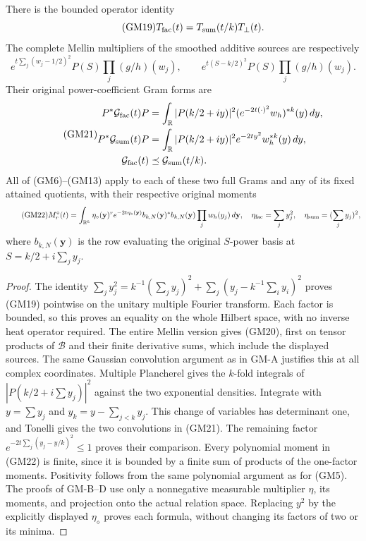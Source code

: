 \begin{theorem}
There is the bounded operator identity
\begin{equation}\tag{GM19}
 T_{\rm fac}(t)=T_{\rm sum}(t/k)T_{\perp}(t).
\end{equation}
The complete Mellin multipliers of the smoothed additive sources are
respectively
\begin{equation}\tag{GM20}
 e^{t\sum_j(w_j-1/2)^2}P(S)\prod_j(g/h)(w_j),\qquad
 e^{t(S-k/2)^2}P(S)\prod_j(g/h)(w_j).
\end{equation}
Their original power-coefficient Gram forms are
\begin{equation}\tag{GM21}
 \begin{split}
 P^*\mathcal G_{\rm fac}(t)P
 &=\int_{\mathbb R}|P(k/2+iy)|^2
               (e^{-2t(\cdot)^2}w_h)^{*k}(y)\,dy,\\
 P^*\mathcal G_{\rm sum}(t)P
 &=\int_{\mathbb R}|P(k/2+iy)|^2
                 e^{-2ty^2}w_h^{*k}(y)\,dy,\\
 \mathcal G_{\rm fac}(t)&\preceq\mathcal G_{\rm sum}(t/k).
 \end{split}
\end{equation}
All of (GM6)--(GM13) apply to each of these two full Grams and any
of its fixed attained quotients, with their respective original
moments
\begin{equation}\tag{GM22}
 M_r^\diamond(t)=\int_{\mathbb R^k}
   \eta_\diamond(\mathbf y)^r e^{-2t\eta_\diamond(\mathbf y)}
   b_{k,N}(\mathbf y)^*b_{k,N}(\mathbf y)
                          \prod_jw_h(y_j)\,d\mathbf y,
 \quad
 \eta_{\rm fac}=\sum_jy_j^2,\quad
 \eta_{\rm sum}=(\sum_jy_j)^2,
\end{equation}
where $b_{k,N}(\mathbf y)$ is the row evaluating the original
$S$-power basis at $S=k/2+i\sum_jy_j$.
\end{theorem}
\begin{proof}
The identity
$\sum_jy_j^2=k^{-1}(\sum_jy_j)^2+
\sum_j(y_j-k^{-1}\sum_i y_i)^2$ proves (GM19) pointwise on the
unitary multiple Fourier transform.  Each factor is bounded, so this
proves an equality on the whole Hilbert space, with no inverse heat
operator required.  The entire Mellin version gives (GM20), first on
tensor products of $\mathscr B$ and their finite derivative sums,
which include the displayed sources.  The same Gaussian convolution
argument as in GM-A justifies this at all complex coordinates.
Multiple Plancherel gives the $k$-fold integrals of
$|P(k/2+i\sum y_j)|^2$ against the two exponential densities.
Integrate with $y=\sum y_j$ and
$y_k=y-\sum_{j<k}y_j$.  This change of variables has determinant
one, and Tonelli gives the two convolutions in (GM21).  The remaining
factor $e^{-2t\sum_j(y_j-y/k)^2}\leq1$ proves their comparison.
Every polynomial moment in (GM22) is finite, since it is bounded by
a finite sum of products of the one-factor moments.  Positivity
follows from the same polynomial argument as for (GM5).
The proofs of GM-B--D use only a nonnegative measurable multiplier
$\eta$, its moments, and projection onto the actual relation space.
Replacing $y^2$ by the explicitly displayed $\eta_\diamond$ proves
each formula, without changing its factors of two or its minima.
\end{proof}

